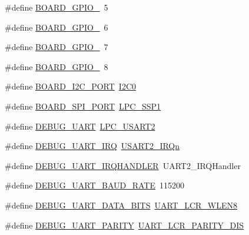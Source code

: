 \begin{DoxyCompactItemize}
\item 
\#define \hyperlink{group__hal_ga6b6232587c708ae18d40761da132a639}{B\+O\+A\+R\+D\+\_\+\+G\+P\+I\+O\+\_}~5
\item 
\#define \hyperlink{group__hal_gaaa12b059cf7ab1ceb75ebd0f3d6d2567}{B\+O\+A\+R\+D\+\_\+\+G\+P\+I\+O\+\_}~6
\item 
\#define \hyperlink{group__hal_ga72a3d0e50d2b86db0a58fe0211ceb541}{B\+O\+A\+R\+D\+\_\+\+G\+P\+I\+O\+\_}~7
\item 
\#define \hyperlink{group__hal_ga590b5582ab60d050d19b4db29a542892}{B\+O\+A\+R\+D\+\_\+\+G\+P\+I\+O\+\_}~8
\item 
\#define \hyperlink{group__hal_ga61de281c729ef3680e5e8712056146f7}{B\+O\+A\+R\+D\+\_\+\+I2\+C\+\_\+\+P\+O\+RT}~\hyperlink{i2c__18xx__43xx_8h_gaec46000c6a1fe2c12c9a0c7ee3677626a8b606b29817406621b85b78b1ee9e653}{I2\+C0}
\item 
\#define \hyperlink{group__hal_ga231a44aa9acf60e939bdb959ad620a0f}{B\+O\+A\+R\+D\+\_\+\+S\+P\+I\+\_\+\+P\+O\+RT}~\hyperlink{group___p_e_r_i_p_h__43_x_x___b_a_s_e_ga09c4610ada1d9aa18913963cbd1a6e52}{L\+P\+C\+\_\+\+S\+S\+P1}
\item 
\#define \hyperlink{group__hal_gace21428290f0e412332701391f825a10}{D\+E\+B\+U\+G\+\_\+\+U\+A\+RT}~\hyperlink{group___p_e_r_i_p_h__43_x_x___b_a_s_e_gae6539c90608a0da79ee287639201fc6c}{L\+P\+C\+\_\+\+U\+S\+A\+R\+T2}
\item 
\#define \hyperlink{group__hal_ga753111eb59a5414820fd948b0689054d}{D\+E\+B\+U\+G\+\_\+\+U\+A\+R\+T\+\_\+\+I\+RQ}~\hyperlink{group___c_m_s_i_s__43_x_x___m0___i_r_q_gga402456eb2f4f5b3dc2a53f725eed9485a3f9c48714d0e5baaba6613343f0da68e}{U\+S\+A\+R\+T2\+\_\+\+I\+R\+Qn}
\item 
\#define \hyperlink{group__hal_gab5642720149ac26cffc93c59d3ca23b8}{D\+E\+B\+U\+G\+\_\+\+U\+A\+R\+T\+\_\+\+I\+R\+Q\+H\+A\+N\+D\+L\+ER}~U\+A\+R\+T2\+\_\+\+I\+R\+Q\+Handler
\item 
\#define \hyperlink{group__hal_gadf735c02ae01a655dbbfc89683107df1}{D\+E\+B\+U\+G\+\_\+\+U\+A\+R\+T\+\_\+\+B\+A\+U\+D\+\_\+\+R\+A\+TE}~115200
\item 
\#define \hyperlink{group__hal_ga5461cba1b266ac88e586ceb025c2a993}{D\+E\+B\+U\+G\+\_\+\+U\+A\+R\+T\+\_\+\+D\+A\+T\+A\+\_\+\+B\+I\+TS}~\hyperlink{group___u_a_r_t__18_x_x__43_x_x_ga71ecde192fb0c9facb9ef9c6b77cc687}{U\+A\+R\+T\+\_\+\+L\+C\+R\+\_\+\+W\+L\+E\+N8}
\item 
\#define \hyperlink{group__hal_gaec7cd5ed121d05a86fd013b6456ed725}{D\+E\+B\+U\+G\+\_\+\+U\+A\+R\+T\+\_\+\+P\+A\+R\+I\+TY}~\hyperlink{group___u_a_r_t__18_x_x__43_x_x_ga91bc2978f5af5ac9a1f18af284275b39}{U\+A\+R\+T\+\_\+\+L\+C\+R\+\_\+\+P\+A\+R\+I\+T\+Y\+\_\+\+D\+IS}

\end{DoxyCompactItemize}
